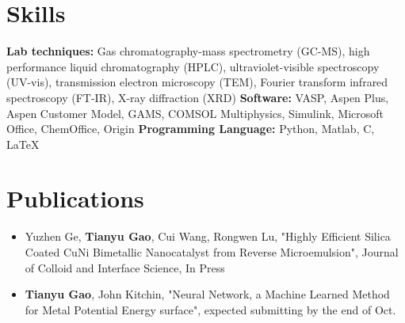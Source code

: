 \documentclass[a4paper,11pt]{article}
\begin{document}
\section{Skills}

\cvitem {} { \textbf{Lab techniques:} Gas chromatography-mass spectrometry (GC-MS), high performance liquid chromatography (HPLC), ultraviolet-visible spectroscopy (UV-vis), transmission electron microscopy (TEM), Fourier transform infrared spectroscopy (FT-IR), X-ray diffraction (XRD)}
\cvitem {} {\textbf{Software:} VASP, Aspen Plus, Aspen Customer Model, GAMS, COMSOL Multiphysics, Simulink, Microsoft Office, ChemOffice, Origin}
\cvitem {} {\textbf{Programming Language:} Python, Matlab, C, \LaTeX}



\section{Publications}
\begin{itemize}
\item Yuzhen Ge, \textbf{Tianyu Gao}, Cui Wang, Rongwen Lu, "Highly Efficient Silica Coated CuNi Bimetallic Nanocatalyst from Reverse Microemulsion", Journal of Colloid and Interface Science, In Press
\item \textbf{Tianyu Gao}, John Kitchin, "Neural Network, a Machine Learned Method for Metal Potential Energy surface", expected submitting by the end of Oct.
\end{itemize}
\end{document}
